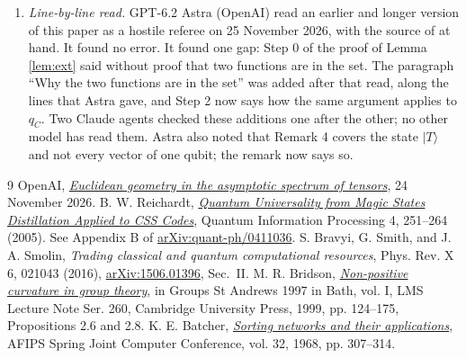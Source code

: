 \documentclass[11pt]{article}
\theoremstyle{definition}
\newcommand{\ket}[1]{|#1\rangle}
\begin{document}
\begin{enumerate}
\item \emph{Line-by-line read.} GPT-6.2 Astra (OpenAI) read an earlier and longer version of this paper as a hostile referee on 25 November 2026, with the source of \cite{EG} at hand. It found no error. It found one gap: Step 0 of the proof of Lemma \ref{lem:ext} said without proof that two functions are in the set. The paragraph ``Why the two functions are in the set'' was added after that read, along the lines that Astra gave, and Step 2 now says how the same argument applies to $q_C$. Two Claude agents checked these additions one after the other; no other model has read them. Astra also noted that Remark 4 covers the state $\ket T$ and not every vector of one qubit; the remark now says so.
\end{enumerate}

\begin{thebibliography}{9}
 OpenAI, \href{https://github.com/openai/math/blob/3344da59991ed94f9ba711217b29c1d760badfa6/preprints/Euclidean-geometry-in-the-asymptotic-spectrum-of-tensors-November-24-2026/paper.pdf}{\emph{Euclidean geometry in the asymptotic spectrum of tensors}}, 24 November 2026.
 B. W. Reichardt, \href{https://doi.org/10.1007/s11128-005-7654-8}{\emph{Quantum Universality from Magic States Distillation Applied to CSS Codes}}, Quantum Information Processing 4, 251--264 (2005). See Appendix B of \href{https://arxiv.org/pdf/quant-ph/0411036}{arXiv:quant-ph/0411036}.
 S. Bravyi, G. Smith, and J. A. Smolin, \emph{Trading classical and quantum computational resources}, Phys. Rev. X 6, 021043 (2016), \href{https://arxiv.org/abs/1506.01396}{arXiv:1506.01396}, Sec.~II.
 M. R. Bridson, \href{https://people.maths.ox.ac.uk/bridson/papers/BATH97.pdf}{\emph{Non-positive curvature in group theory}}, in Groups St Andrews 1997 in Bath, vol. I, LMS Lecture Note Ser. 260, Cambridge University Press, 1999, pp. 124--175, Propositions 2.6 and 2.8.
 K. E. Batcher, \href{https://doi.org/10.1145/1468075.1468121}{\emph{Sorting networks and their applications}}, AFIPS Spring Joint Computer Conference, vol. 32, 1968, pp. 307--314.
\end{thebibliography}
\end{document}
